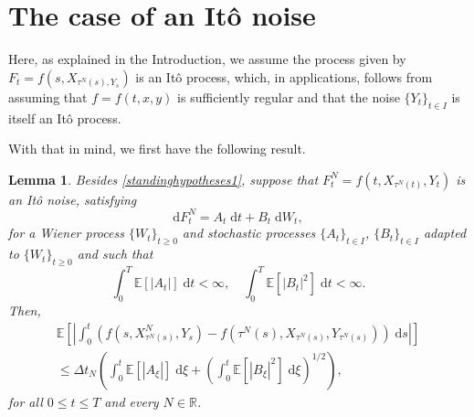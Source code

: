\documentclass[reqno,12pt]{amsart}
\theoremstyle{plain}%
\newtheorem{lem}{Lemma}[section]
\theoremstyle{definition}
\begin{document}
\section{The case of an It\^o noise}
\label{secItonoise}

Here, as explained in the Introduction, we assume the process given by $F_t = f(s, X_{\tau^N(s), Y_s})$ is an It\^o process, which, in applications, follows from assuming that $f=f(t, x, y)$ is sufficiently regular and that the noise $\{Y_t\}_{t\in I}$ is itself an It\^o process.

With that in mind, we first have the following result.
\begin{lem}
    \label{lemItostep}
    Besides \cref{standinghypotheses1}, suppose that $F_t^N = f(t, X_{\tau^N(t)}, Y_t)$ is an It\^o noise, satisfying
    \begin{equation}
        \label{Itostep}
        \mathrm{d}F_t^N = A_t\;\mathrm{d}t + B_t\;\mathrm{d}W_t,
    \end{equation}
    for a Wiener process $\{W_t\}_{t\geq 0}$ and stochastic processes $\{A_t\}_{t\in I}$, $\{B_t\}_{t\in I}$ adapted to $\{W_t\}_{t\geq 0}$ and such that
    \begin{equation}
        \label{expectItostepterms}
        \int_0^T \mathbb{E}[|A_t|] \;\mathrm{d}t < \infty, \quad \int_0^T \mathbb{E}[|B_t|^2] \;\mathrm{d}t < \infty.
    \end{equation}
    Then,
    \begin{multline}
        \label{expectintfboundbyIto}
        \mathbb{E}\left[\left|\int_0^t \left(f(s, X_{\tau^N(s)}^N, Y_s) - f(\tau^N(s), X_{\tau^N(s)}, Y_{\tau^N(s)})\right)\;\mathrm{d}s\right|\right]  \\
        \leq \Delta t_N \left(\int_0^t \mathbb{E}[|A_\xi|] \;\mathrm{d}\xi + \left(\int_0^t \mathbb{E}[|B_\xi|^2] \;\mathrm{d}\xi \right)^{1/2}\right),
    \end{multline}
    for all $0 \leq t \leq T$ and every $N\in \mathbb{R}$.
\end{lem}
\end{document}
